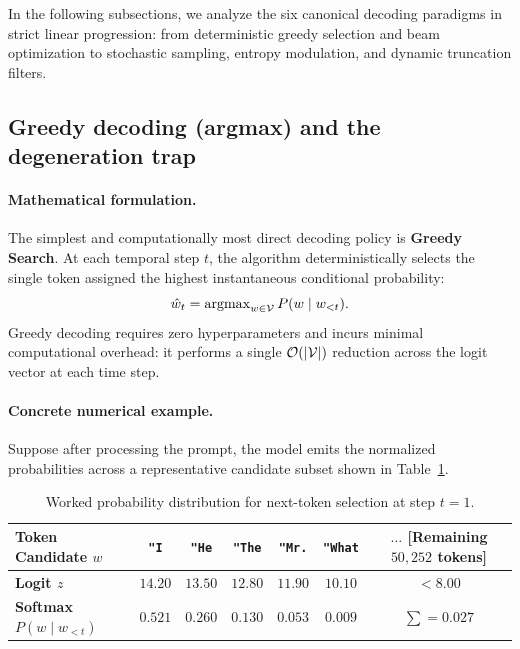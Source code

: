 \documentclass[../../main.tex]{subfiles}
\begin{document}
In the following subsections, we analyze the six canonical decoding paradigms in strict linear progression: from deterministic greedy selection and beam optimization to stochastic sampling, entropy modulation, and dynamic truncation filters.

\subsection{Greedy decoding (argmax) and the degeneration trap}
\label{subsec:greedy_decoding}

\paragraph{Mathematical formulation.}
The simplest and computationally most direct decoding policy is \textbf{Greedy Search}. At each temporal step $t$, the algorithm deterministically selects the single token assigned the highest instantaneous conditional probability:
\begin{equation}
\label{eq:greedy_selection}
\hat{w}_t = \operatorname{argmax}_{w \in \mathcal{V}} P(w \mid w_{<t}).
\end{equation}
Greedy decoding requires zero hyperparameters and incurs minimal computational overhead: it performs a single $\mathcal{O}(|\mathcal{V}|)$ reduction across the logit vector at each time step.

\paragraph{Concrete numerical example.}
Suppose after processing the prompt, the model emits the normalized probabilities across a representative candidate subset shown in Table~\ref{tab:greedy_example}.

\begin{table}[htbp]
\centering
\small
\caption{Worked probability distribution for next-token selection at step $t=1$.}
\label{tab:greedy_example}
\begin{tabular}{lcccccc}
\toprule
\textbf{Token Candidate $w$} & \texttt{"I} & \texttt{"He} & \texttt{"The} & \texttt{"Mr.} & \texttt{"What} & $\dots$ [Remaining $50{,}252$ tokens] \\
\midrule
\textbf{Logit $z$} & $14.20$ & $13.50$ & $12.80$ & $11.90$ & $10.10$ & $< 8.00$ \\
\textbf{Softmax $P(w \mid w_{<t})$} & $\mathbf{0.521}$ & $0.260$ & $0.130$ & $0.053$ & $0.009$ & $\sum = 0.027$ \\
\bottomrule
\end{tabular}
\end{table}
\end{document}
